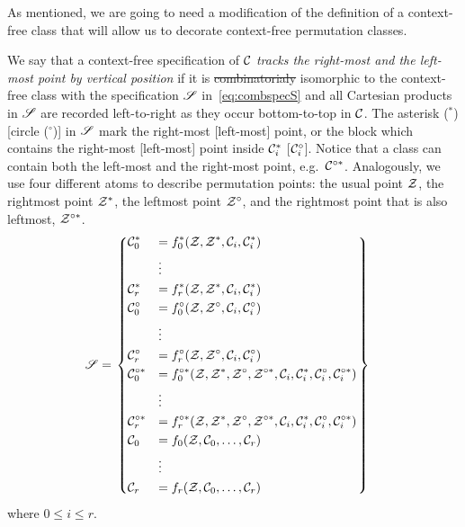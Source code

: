 \documentclass[12pt, a4paper, twoside]{report}
\providecommand{\DIFaddtex}[1]{{\protect\color{blue}\uwave{#1}}} %
\providecommand{\DIFdeltex}[1]{{\protect\color{red}\sout{#1}}}                      %
\providecommand{\DIFaddbegin}{} %
\providecommand{\DIFaddend}{} %
\providecommand{\DIFdelbegin}{} %
\providecommand{\DIFdelend}{} %
\providecommand{\DIFadd}[1]{\texorpdfstring{\DIFaddtex{#1}}{#1}} %
\providecommand{\DIFdel}[1]{\texorpdfstring{\DIFdeltex{#1}}{}} %
\begin{document}
As mentioned, we are going to need a modification of the definition of a context-free class that will allow us to decorate context-free permutation classes. 
\begin{definition}
  We say that a context-free specification of $\mathcal{C}$ \emph{tracks the right-most and the left-most point by vertical position} if it is \DIFdelbegin \DIFdel{combinatorialy }\DIFdelend \DIFaddbegin \DIFadd{combinatorially }\DIFaddend isomorphic to the context-free class with the specification $\mathscr{S}$ in~\eqref{eq:combspecS} and all Cartesian products in $\mathscr{S}$ are recorded left-to-right as they occur bottom-to-top in $\mathcal{C}$. The asterisk (${}^*$) [circle (${}^\circ$)] in $\mathscr{S}$ mark the right-most [left-most] point, or the block which contains the right-most [left-most] point inside $\mathcal{C}_i^*$ [$\mathcal{C}_i^\circ$]. Notice that a class can contain both the left-most and the right-most point, e.g.~$\mathcal{C}^{\circ*}$. Analogously, we use four different atoms to describe permutation points: the usual point $\mathcal{Z}$, the rightmost point $\mathcal{Z}^*$, the leftmost point $\mathcal{Z}^\circ$, and the rightmost point that is also leftmost, $\mathcal{Z}^{\circ*}$. 
  \begin{align}
\mathscr{S} &=  \begin{rcases}\begin{dcases}
  \mathcal{C}_0^* &= f_0^*(\mathcal{Z},\mathcal{Z}^*,\mathcal{C}_i, \mathcal{C}_i^*)\\
       &\vdots\\
  \mathcal{C}_r^* &= f_r^*(\mathcal{Z},\mathcal{Z}^*,\mathcal{C}_i, \mathcal{C}_i^*)\\
  \mathcal{C}_0^\circ &= f_0^\circ(\mathcal{Z},\mathcal{Z}^\circ,\mathcal{C}_i,\mathcal{C}_i^\circ)\\
       &\vdots\\
  \mathcal{C}_r^\circ &= f_r^\circ(\mathcal{Z},\mathcal{Z}^\circ,\mathcal{C}_i, \mathcal{C}_i^\circ)\\
  \mathcal{C}_0^{\circ*} &= f_0^{\circ*}(\mathcal{Z},\mathcal{Z}^*,\mathcal{Z}^\circ,\mathcal{Z}^{\circ *}, \mathcal{C}_i, \mathcal{C}_i^*,\mathcal{C}_i^\circ, \mathcal{C}_i^{\circ *})\\
       &\vdots\\
  \mathcal{C}_r^{\circ*} &= f_r^{\circ*}(\mathcal{Z},\mathcal{Z}^*,\mathcal{Z}^\circ,\mathcal{Z}^{\circ *}, \mathcal{C}_i, \mathcal{C}_i^*,\mathcal{C}_i^\circ, \mathcal{C}_i^{\circ *})\\
  \mathcal{C}_0 &= f_0(\mathcal{Z},\mathcal{C}_0,\ldots,\mathcal{C}_r)\\
       &\vdots\\
  \mathcal{C}_r &= f_r(\mathcal{Z},\mathcal{C}_0,\ldots,\mathcal{C}_r)
       \end{dcases}
     \end{rcases}
         \label{eq:combspecS}
  \end{align}
  where $0 \leq i \leq r$. 
 \end{definition}
\end{document}
